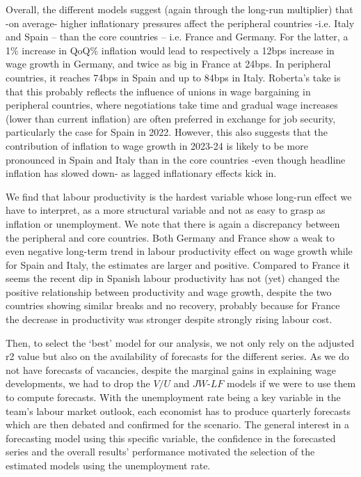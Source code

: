 Overall, the different models suggest (again through the long-run multiplier) that -on average- higher inflationary pressures affect the peripheral countries -i.e. Italy and Spain – than the core countries – i.e. France and Germany. 
For the latter, a 1\% increase in QoQ\% inflation would lead to respectively a 12bps increase in wage growth in Germany, and twice as big in France at 24bps. 
In peripheral countries, it reaches 74bps in Spain and up to 84bps in Italy. 
Roberta’s take is that this probably reflects the influence of unions in wage bargaining in peripheral countries, where negotiations take time and gradual wage increases (lower than current inflation) are often preferred in exchange for job security, particularly the case for Spain in 2022. 
However, this also suggests that the contribution of inflation to wage growth in 2023-24 is likely to be more pronounced in Spain and Italy than in the core countries -even though headline inflation has slowed down- as lagged inflationary effects kick in.

We find that labour productivity is the hardest variable whose long-run effect we have to interpret, as a more structural variable and not as easy to grasp as inflation or unemployment. 
We note that there is again a discrepancy between the peripheral and core countries. 
Both Germany and France show a weak to even negative long-term trend in labour productivity effect on wage growth while for Spain and Italy, the estimates are larger and positive. 
Compared to France it seems the recent dip in Spanish labour productivity has not (yet) changed the positive relationship between productivity and wage growth, despite the two countries showing similar breaks and no recovery, probably because for France the decrease in productivity was stronger despite strongly rising labour cost.

Then, to select the ‘best’ model for our analysis, we not only rely on the adjusted r2 value but also on the availability of forecasts for the different series. 
As we do not have forecasts of vacancies, despite the marginal gains in explaining wage developments, we had to drop the $V/U$ and $JW\textrm{-}LF$ models if we were to use them to compute forecasts. 
With the unemployment rate being a key variable in the team’s labour market outlook, each economist has to produce quarterly forecasts which are then debated and confirmed for the scenario. 
The general interest in a forecasting model using this specific variable, the confidence in the forecasted series and the overall results’ performance motivated the selection of the estimated models using the unemployment rate.

